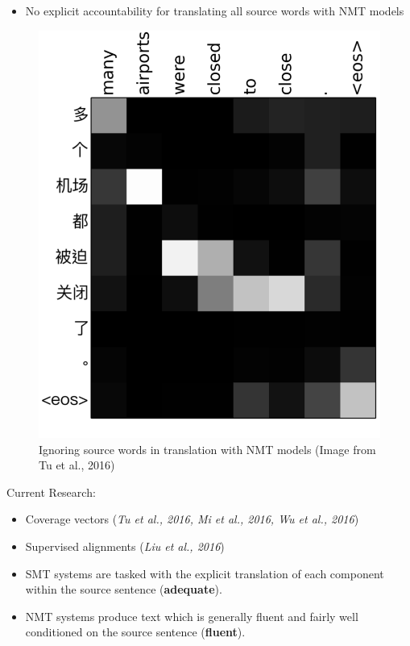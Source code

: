 \documentclass[landscape]{jhuslides3C}
\begin{document}
\begin{itemize}
\item No explicit accountability for translating all source words with NMT models
\end{itemize}
\begin{figure}
\begin{center}
\includegraphics[scale=0.2]{images/coverage.png}
\caption{Ignoring source words in translation with NMT models ({\tiny Image from Tu et al., 2016})}
\end{center}
\end{figure}
Current Research: 
\begin{itemize}
\item Coverage vectors (\textit{Tu et al., 2016, Mi et al., 2016, Wu et al., 2016})
\item Supervised alignments (\textit{Liu et al., 2016})
\end{itemize}

\begin{itemize}
\item SMT systems are tasked with the explicit translation of each component within the source sentence (\textbf{adequate}).
\item NMT systems produce text which is generally fluent and fairly well conditioned on the source sentence (\textbf{fluent}).
\end{itemize}
\end{document}
